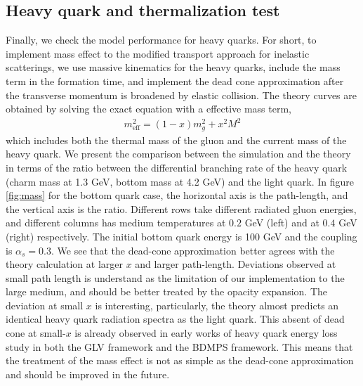 \subsection{Heavy quark and thermalization test}
Finally, we check the model performance for heavy quarks.
For short, to implement mass effect to the modified transport approach for inelastic scatterings, we use massive kinematics for the heavy quarks, include the mass term in the formation time, and implement the dead cone approximation after the transverse momentum is broadened by elastic collision.
The theory curves are obtained by solving the exact equation with a effective mass term,
\begin{eqnarray}
m_{\textrm{eff}}^2 = (1-x)m_g^2 + x^2 M^2
\end{eqnarray}
which includes both the thermal mass of the gluon and the current mass of the heavy quark.
We present the comparison between the simulation and the theory in terms of the ratio between the differential branching rate of the heavy quark (charm mass at 1.3 GeV, bottom mass at 4.2 GeV) and the light quark.
In figure \ref{fig:mass} for the bottom quark case, the horizontal axis is the path-length, and the vertical axis is the ratio.
Different rows take different radiated gluon energies, and different  columns has medium temperatures at $0.2$ GeV (left) and at $0.4$ GeV (right) respectively.
The initial bottom quark energy is 100 GeV and the coupling is $\alpha_s=0.3$.
We see that the dead-cone approximation better agrees with the theory calculation at larger $x$ and larger path-length.
Deviations observed at small path length is understand as the limitation of our implementation to the large medium, and should be better treated by the opacity expansion. 
The deviation at small $x$ is interesting, particularly, the theory almost predicts an identical heavy quark radiation spectra as the light quark. This absent of dead cone at small-$x$ is already observed in early works of heavy quark energy loss study in both the GLV framework and the BDMPS framework.
This means that the treatment of the mass effect is not as simple as the dead-cone approximation and should be improved in the future.


